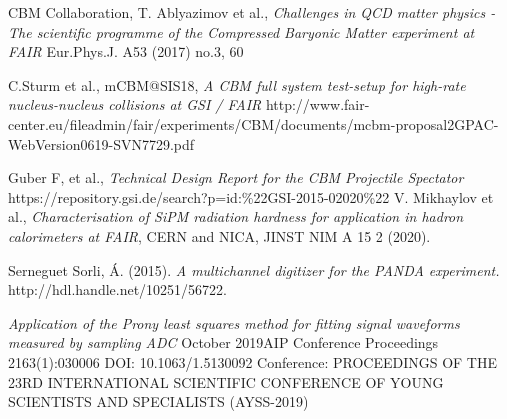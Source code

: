 \documentclass[a4paper,11pt]{article}
\begin{document}
\begin{thebibliography}{99}


CBM Collaboration, T. Ablyazimov et al., \emph{Challenges in QCD matter physics -The scientific programme of the Compressed Baryonic Matter experiment at FAIR} Eur.Phys.J. A53 (2017) no.3, 60 


C.Sturm et al., mCBM@SIS18, \emph{A CBM full system test-setup for high-rate nucleus-nucleus collisions at GSI / FAIR} http://www.fair-center.eu/fileadmin/fair/experiments/CBM/documents/mcbm-proposal2GPAC-WebVersion0619-SVN7729.pdf

Guber F, et al., \emph{Technical Design Report for the CBM Projectile Spectator} https://repository.gsi.de/search?p=id:\%22GSI-2015-02020\%22
V. Mikhaylov et al., \emph{Characterisation of SiPM radiation hardness for application in hadron calorimeters at FAIR}, CERN and NICA, JINST NIM A 15 2 (2020).

Serneguet Sorli, Á. (2015). \emph{A multichannel digitizer for the PANDA experiment.} http://hdl.handle.net/10251/56722.

\emph{Application of the Prony least squares method for fitting signal waveforms measured by sampling ADC}
October 2019AIP Conference Proceedings 2163(1):030006
DOI: 10.1063/1.5130092
Conference: PROCEEDINGS OF THE 23RD INTERNATIONAL SCIENTIFIC CONFERENCE OF YOUNG SCIENTISTS AND SPECIALISTS (AYSS-2019)



\end{thebibliography}
\end{document}
